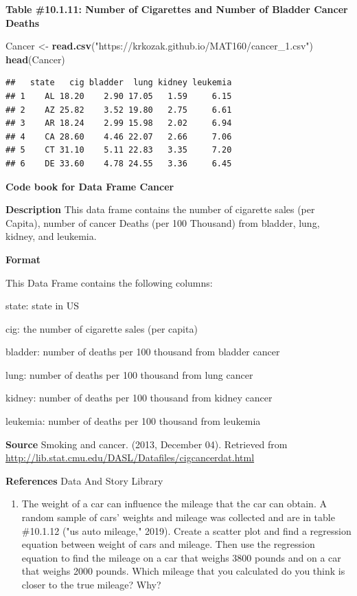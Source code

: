 \documentclass[
]{book}
\newenvironment{Shaded}{\begin{snugshade}}{\end{snugshade}}
\newcommand{\KeywordTok}[1]{\textcolor[rgb]{0.13,0.29,0.53}{\textbf{#1}}}
\newcommand{\NormalTok}[1]{#1}
\newcommand{\StringTok}[1]{\textcolor[rgb]{0.31,0.60,0.02}{#1}}
\providecommand{\tightlist}{%
  \setlength{\itemsep}{0pt}\setlength{\parskip}{0pt}}
\begin{document}
\textbf{Table \#10.1.11: Number of Cigarettes and Number of Bladder Cancer Deaths}

\begin{Shaded}
\begin{Highlighting}[]
\NormalTok{Cancer <-}\StringTok{ }\KeywordTok{read.csv}\NormalTok{(}\StringTok{"https://krkozak.github.io/MAT160/cancer_1.csv"}\NormalTok{)}
\KeywordTok{head}\NormalTok{(Cancer)}
\end{Highlighting}
\end{Shaded}

\begin{verbatim}
##   state   cig bladder  lung kidney leukemia
## 1    AL 18.20    2.90 17.05   1.59     6.15
## 2    AZ 25.82    3.52 19.80   2.75     6.61
## 3    AR 18.24    2.99 15.98   2.02     6.94
## 4    CA 28.60    4.46 22.07   2.66     7.06
## 5    CT 31.10    5.11 22.83   3.35     7.20
## 6    DE 33.60    4.78 24.55   3.36     6.45
\end{verbatim}

\textbf{Code book for Data Frame Cancer}

\textbf{Description}
This data frame contains the number of cigarette sales (per Capita), number of cancer Deaths (per 100 Thousand) from bladder, lung, kidney, and leukemia.

\textbf{Format}

This Data Frame contains the following columns:

state: state in US

cig: the number of cigarette sales (per capita)

bladder: number of deaths per 100 thousand from bladder cancer

lung: number of deaths per 100 thousand from lung cancer

kidney: number of deaths per 100 thousand from kidney cancer

leukemia: number of deaths per 100 thousand from leukemia

\textbf{Source}
Smoking and cancer. (2013, December 04). Retrieved from
\url{http://lib.stat.cmu.edu/DASL/Datafiles/cigcancerdat.html}

\textbf{References}
Data And Story Library

\begin{enumerate}
\def\labelenumi{\arabic{enumi}.}
\setcounter{enumi}{9}
\tightlist
\item
  The weight of a car can influence the mileage that the car can obtain. A random sample of cars' weights and mileage was collected and are in table \#10.1.12 ("us auto mileage," 2019). Create a scatter plot and find a regression equation between weight of cars and mileage. Then use the regression equation to find the mileage on a car that weighs 3800 pounds and on a car that weighs 2000 pounds. Which mileage that you calculated do you think is closer to the true mileage? Why?
\end{enumerate}
\end{document}
